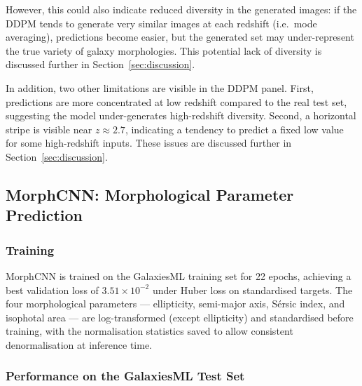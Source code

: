 \documentclass[fleqn,usenatbib]{mnras}
\begin{document}
However, this could also indicate reduced diversity in the generated
images: if the DDPM tends to generate very similar images at each
redshift (i.e.\ mode averaging), predictions become easier, but the
generated set may under-represent the true variety of galaxy
morphologies.
This potential lack of diversity is discussed further in
Section~\ref{sec:discussion}.

In addition, two other limitations are visible in the DDPM panel.
First, predictions are more concentrated at low redshift compared to
the real test set, suggesting the model under-generates high-redshift
diversity.
Second, a horizontal stripe is visible near $z \approx 2.7$, indicating
a tendency to predict a fixed low value for some high-redshift inputs.
These issues are discussed further in Section~\ref{sec:discussion}.





















\subsection{MorphCNN: Morphological Parameter Prediction}
\label{sec:morphcnn_results}

\subsubsection{Training}

MorphCNN is trained on the GalaxiesML training set for 22 epochs,
achieving a best validation loss of $3.51 \times 10^{-2}$ under
Huber loss on standardised targets.
The four morphological parameters --- ellipticity, semi-major axis,
S\'{e}rsic index, and isophotal area --- are log-transformed (except
ellipticity) and standardised before training, with the normalisation
statistics saved to allow consistent denormalisation at inference time.

\subsubsection{Performance on the GalaxiesML Test Set}
\end{document}
